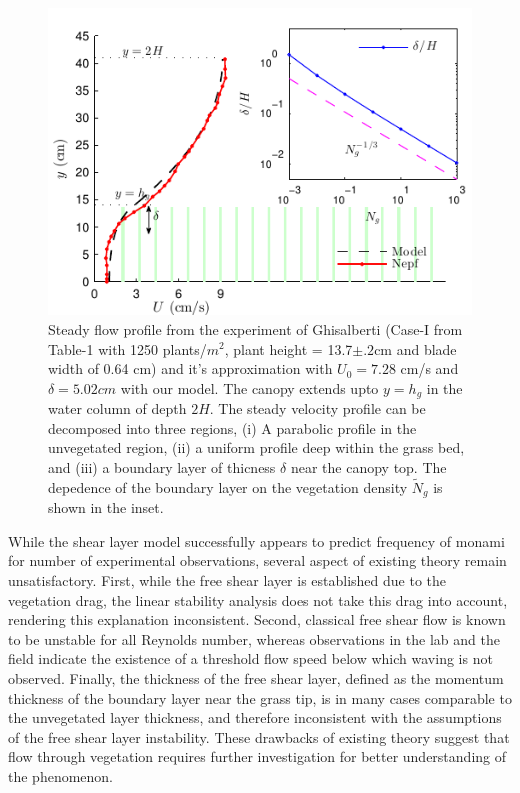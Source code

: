 \documentclass[aps,prl,reprint,twocolumn,showpacs,superscriptaddress,10pt]{revtex4-1}  %
\newcommand{\Ndg}{\tilde{N}_g}
\begin{document}
\begin{figure}
\includegraphics[scale=1]{Grass_Base_Nepf_shear}
\caption{Steady flow profile from the experiment of Ghisalberti\cite{Nepf04} (Case-I from Table-1 with 1250 plants/$m^2$, 
plant height = 13.7$\pm .2$cm and blade width of 0.64 cm)
 and it's approximation with $U_0=7.28$ cm/s and $\delta = 5.02cm$ with our model. The canopy extends upto $y=h_g$ in the water column of depth $2H$. 
The steady velocity profile can be decomposed into three regions, (i) A parabolic profile in the unvegetated region, (ii) a uniform profile deep within the grass bed, and (iii) a boundary layer of thicness $\delta$ near the canopy top. The depedence of the boundary layer on the vegetation density $\Ndg$ is shown in the inset.}
\label{fig:basicflow}
\end{figure}

While the shear layer model successfully appears to predict frequency of monami for number of experimental observations, several aspect of existing theory remain unsatisfactory. 
First, while the free shear layer is established due to the vegetation drag, the linear stability analysis\cite{Raupach96} does not take this drag into account, rendering this explanation inconsistent. 
Second, classical free shear flow is known to be unstable for all Reynolds number\cite{drazin}, whereas observations in the lab\cite{Ghisal02} and the field\cite{Grizzle96} indicate the existence of a threshold flow speed below which waving is not observed. 
Finally, the thickness of the free shear layer, defined as the momentum thickness of the boundary layer near the grass tip, is in many cases comparable to the unvegetated layer thickness,
and therefore inconsistent with the assumptions of the free shear layer instability. 
These drawbacks of existing theory suggest that flow through vegetation requires further investigation for better understanding of the phenomenon.
\end{document}
